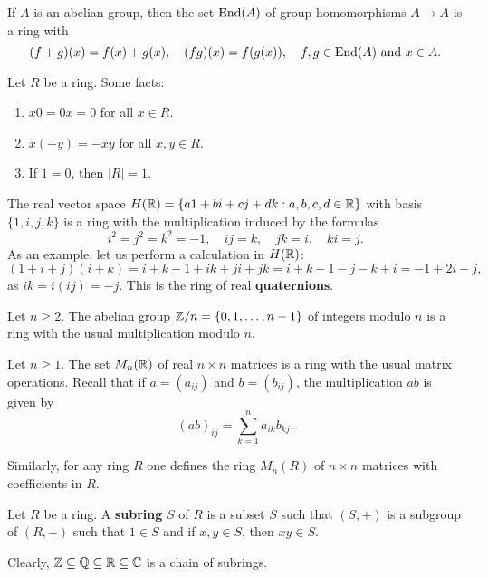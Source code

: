 \begin{example}
    If $A$ is an abelian group, then 
    the set 
    $\operatorname{End}(A)$ of group homomorphisms $A\to A$ is a ring with
    \[
    (f+g)(x)=f(x)+g(x),\quad
    (fg)(x)=f(g(x)),\quad f,g\in\operatorname{End}(A)\text{ and }x\in A.
    \]
\end{example}

Let $R$ be a ring. 
Some facts:
\begin{enumerate}
    \item $x0=0x=0$ for all $x\in R$.
    \item $x(-y)=-xy$ for all $x,y\in R$.
    \item If $1=0$, then $|R|=1$. 
\end{enumerate}

\begin{example}
    The real vector space $H(\mathbb{R})=\{a1+bi+cj+dk:a,b,c,d\in\mathbb{R}\}$ with basis $\{1,i,j,k\}$ 
    is a ring with the multiplication induced by
    the formulas 
    \[
    i^2=j^2=k^2=-1,
    \quad ij=k,
    \quad jk=i,
    \quad ki=j.
    \]
    As an example, let us perform a calculation in $H(\mathbb{R})$: 
    \[
    (1+i+j)(i+k)=i+k-1+ik+ji+jk=i+k-1-j-k+i=-1+2i-j,
    \]
    as $ik=i(ij)=-j$. This is the ring of real \textbf{quaternions}.
\end{example}

\begin{example}
    Let $n\geq2$. 
    The abelian group $\mathbb{Z}/n=\{0,1,\dots,n-1\}$ of integers modulo $n$ is a ring 
    with the usual multiplication modulo $n$. 
\end{example}

\begin{example}
    Let $n\geq1$. 
    The set $M_n(\mathbb{R})$ of real $n\times n$ matrices is a ring with the usual matrix operations. Recall
    that if $a=(a_{ij})$ and $b=(b_{ij})$, the multiplication $ab$ is given by
    \[
    (ab)_{ij}=\sum_{k=1}^n a_{ik}b_{kj}.
    \]
\end{example}

Similarly, for any ring $R$ one defines the ring $M_n(R)$ of $n\times n$ matrices
with coefficients in $R$. 

\begin{definition}
    Let $R$ be a ring. A \textbf{subring} $S$ of $R$ is a subset $S$ such that
    $(S,+)$ is a subgroup of $(R,+)$ such that $1\in S$ and 
    if $x,y\in S$, then $xy\in S$. 
\end{definition}

Clearly, $\mathbb{Z}\subseteq\mathbb{Q}\subseteq\mathbb{R}\subseteq\mathbb{C}$ is a chain of subrings. 

